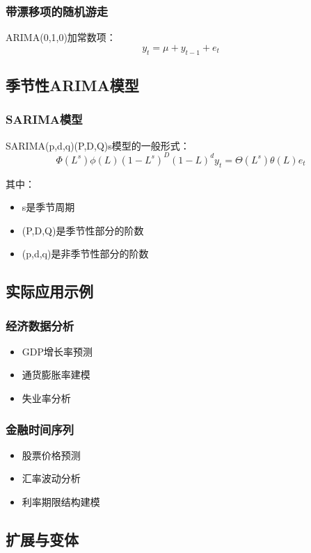 \subsubsection{带漂移项的随机游走}
ARIMA(0,1,0)加常数项：
\[y_t = \mu + y_{t-1} + e_t\]

\subsection{季节性ARIMA模型}
\subsubsection{SARIMA模型}
SARIMA(p,d,q)(P,D,Q)s模型的一般形式：
\[\Phi(L^s)\phi(L)(1-L^s)^D(1-L)^d y_t = \Theta(L^s)\theta(L)e_t\]

其中：
\begin{itemize}
    \item s是季节周期
    \item (P,D,Q)是季节性部分的阶数
    \item (p,d,q)是非季节性部分的阶数
\end{itemize}

\subsection{实际应用示例}
\subsubsection{经济数据分析}
\begin{itemize}
    \item GDP增长率预测
    \item 通货膨胀率建模
    \item 失业率分析
\end{itemize}

\subsubsection{金融时间序列}
\begin{itemize}
    \item 股票价格预测
    \item 汇率波动分析
    \item 利率期限结构建模
\end{itemize}

\subsection{扩展与变体}
